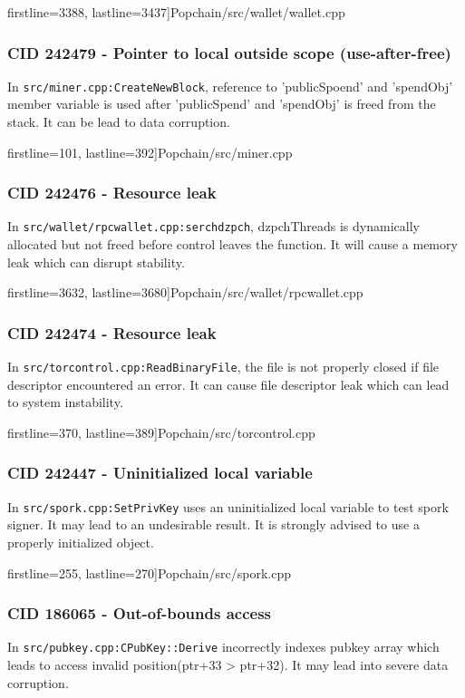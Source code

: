 \documentclass {article}
\begin{document}
 firstline=3388, lastline=3437]{Popchain/src/wallet/wallet.cpp}

\subsubsection{CID 242479 - Pointer to local outside scope (use-after-free)}
In \texttt{src/miner.cpp:CreateNewBlock}, reference to 'publicSpoend' and 'spendObj'
member variable is used after 'publicSpend' and 'spendObj' is freed from the
stack. It can be lead to data corruption.

 firstline=101, lastline=392]{Popchain/src/miner.cpp}

\subsubsection{CID 242476 - Resource leak}
In \texttt{src/wallet/rpcwallet.cpp:serchdzpch}, dzpchThreads is dynamically allocated
but not freed before control leaves the function. It will cause a memory leak
which can disrupt stability.

 firstline=3632, lastline=3680]{Popchain/src/wallet/rpcwallet.cpp}

\subsubsection{CID 242474 - Resource leak}
In \texttt{src/torcontrol.cpp:ReadBinaryFile}, the file is not properly closed if file
descriptor encountered an error. It can cause file descriptor leak which can
lead to system instability.

 firstline=370, lastline=389]{Popchain/src/torcontrol.cpp}

\subsubsection{CID 242447 - Uninitialized local variable}
In \texttt{src/spork.cpp:SetPrivKey} uses an uninitialized local variable to test spork
signer. It may lead to an undesirable result. It is strongly advised to use a
properly initialized object.

 firstline=255, lastline=270]{Popchain/src/spork.cpp}

\subsubsection{CID 186065 - Out-of-bounds access}
In \texttt{src/pubkey.cpp:CPubKey::Derive} incorrectly indexes pubkey array which leads to access
invalid position(ptr+33 > ptr+32). It may lead into severe data corruption.
\end{document}

